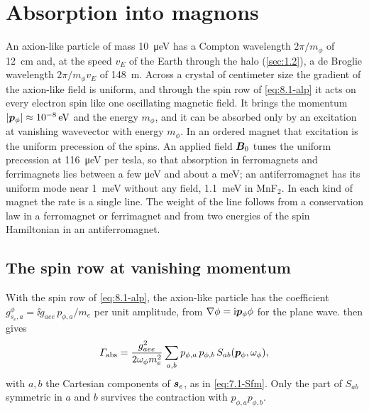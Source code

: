 \section{Absorption into magnons}\label{sec:14.3}

An axion-like particle of mass \SI{10}{\micro eV} has a Compton wavelength $2\pi/m_\phi$ of \SI{12}{cm} and, at the speed $v_E$ of the Earth through the halo (\cref{sec:1.2}), a de Broglie wavelength $2\pi/m_\phi v_E$ of \SI{148}{m}. Across a crystal of centimeter size the gradient of the axion-like field is uniform, and through the spin row of \cref{eq:8.1-alp} it acts on every electron spin like one oscillating magnetic field. It brings the momentum $|\bm{p}_\phi| \approx \SI{e-8}{eV}$ and the energy $m_\phi$, and it can be absorbed only by an excitation at vanishing wavevector with energy $m_\phi$. In an ordered magnet that excitation is the uniform precession of the spins. An applied field $\bm{B}_0$ tunes the uniform precession at \SI{116}{\micro eV} per tesla, so that absorption in ferromagnets and ferrimagnets lies between a few \si{\micro eV} and about a meV; an antiferromagnet has its uniform mode near \SI{1}{meV} without any field, \SI{1.1}{meV} in MnF$_2$. In each kind of magnet the rate is a single line. The weight of the line follows from a conservation law in a ferromagnet or ferrimagnet and from two energies of the spin Hamiltonian in an antiferromagnet.

\subsection{The spin row at vanishing momentum}

With the spin row of \cref{eq:8.1-alp}, the axion-like particle has the coefficient $g^\phi_{s_e,a} = \ii g_{aee}\,p_{\phi,a}/m_e$ per unit amplitude, from $\nabla\phi = \mathrm{i}\bm{p}_\phi\phi$ for the plane wave.  then gives
\begin{equation}
  \varGamma_{\mathrm{abs}} = \frac{g_{aee}^2}{2\omega_\phi m_e^2}\sum_{a,b}p_{\phi,a}\,p_{\phi,b}\,S_{ab}(\bm{p}_\phi,\omega_\phi) ,
  \label{eq:14.3-abs}
\end{equation}
with $a, b$ the Cartesian components of $\bm{s}_e$, as in \cref{eq:7.1-Sfm}. Only the part of $S_{ab}$ symmetric in $a$ and $b$ survives the contraction with $p_{\phi,a}p_{\phi,b}$.

